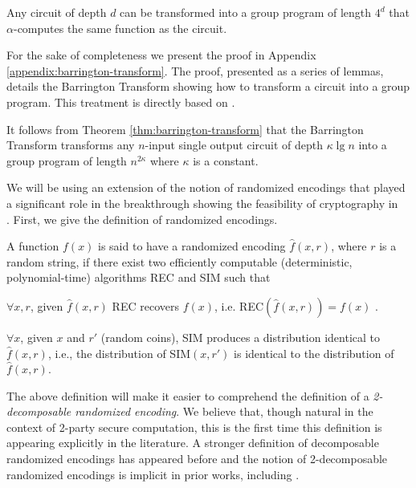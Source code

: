\begin{theorem} 
\label{thm:barrington-transform}
Any circuit  of depth $d$ can be
  transformed   into  a   group   program  of   length  $4^{d}$   that
  $\alpha$-computes the same function as the circuit.
\end{theorem}

For  the  sake  of  completeness  we present  the  proof  in  Appendix
\ref{appendix:barrington-transform}.   The  proof,  presented  as  a  series  of
lemmas, details  the Barrington Transform  showing how to  transform a
circuit  into a  group program.  This  treatment is  directly based  on
\cite{Viola09}.

It  follows  from   Theorem  \ref{thm:barrington-transform}  that  the
Barrington Transform transforms any $n$-input single output circuit of
depth $\kappa\lg n$ into a group program of length $n^{2\kappa}$ where
$\kappa$ is a  constant.  

We will  be using an extension  of the notion  of randomized encodings
\cite{IK00,  AIK05,  A11}  that  played  a  significant  role  in  the
breakthrough  showing  the  feasibility  of cryptography  in  \NCzero~
\cite{AIK04}.  First, we give the definition of randomized encodings.

\begin{definition} 
A   function  $f(x)$   is   said  to   have   a  randomized   encoding
$\hat{f}(x,r)$,  where $r$  is a  random  string, if  there exist  two
efficiently computable (deterministic, polynomial-time) algorithms REC
and SIM such that

 $\forall x,  r$, given  $\hat{f}(x,r)$ REC
recovers $f(x)$, i.e. REC$(\hat{f}(x,r)) = f(x)$ .

  $\forall  x$,  given $x$  and  $r'$  (random
coins), SIM produces a distribution identical to $\hat{f}(x,r)$, i.e.,
the distribution of  SIM$(x, r')$ is identical to  the distribution of
$\hat{f}(x,r)$.

\end{definition}

The above definition will make  it easier to comprehend the definition
of a {\em 2-decomposable randomized encoding}. We believe that, though
natural  in the  context of  2-party secure  computation, this  is the
first   time  this   definition   is  appearing   explicitly  in   the
literature. A stronger definition of decomposable randomized encodings
has  appeared   before  \cite{IKOS08,   IKOS09}  and  the   notion  of
2-decomposable  randomized  encodings  is  implicit  in  prior  works,
including \cite{FKN94}.

